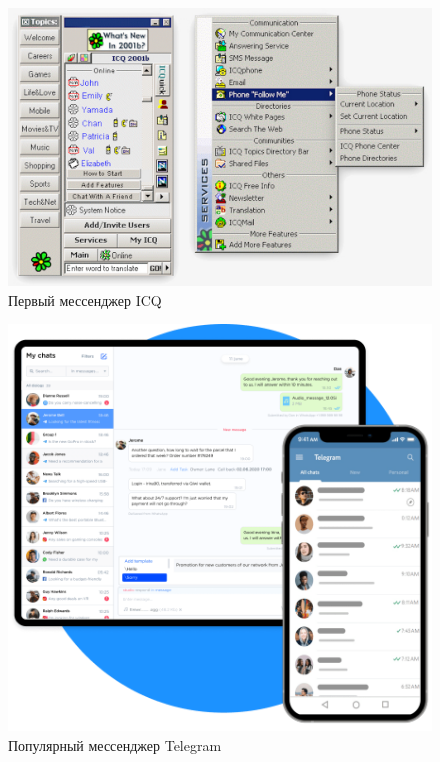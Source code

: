 \begin{figure}
	\centering
	\includegraphics[width=0.7\linewidth]{images/icq}
	\caption{Первый мессенджер ICQ}
	\label{fig:icq}
\end{figure}

\begin{figure}
	\centering
	\includegraphics[width=0.7\linewidth]{images/telegram}
	\caption{Популярный мессенджер Telegram}
	\label{fig:telegram}
\end{figure}
